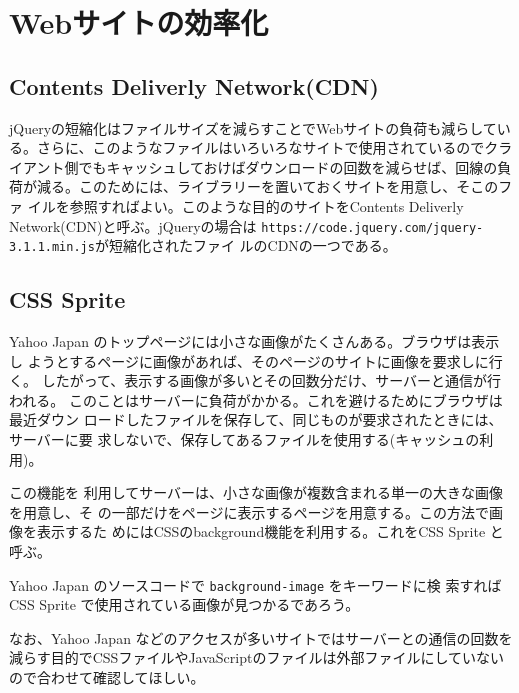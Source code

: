 \section{Webサイトの効率化}
\subsection{Contents Deliverly Network(CDN)}
jQueryの短縮化はファイルサイズを減らすことでWebサイトの負荷も減らしてい
る。さらに、このようなファイルはいろいろなサイトで使用されているのでクラ
イアント側でもキャッシュしておけばダウンロードの回数を減らせば、回線の負
荷が減る。このためには、ライブラリーを置いておくサイトを用意し、そこのファ
イルを参照すればよい。このような目的のサイトをContents Deliverly
Network(CDN)と呼ぶ。jQueryの場合は
\texttt{https://code.jquery.com/jquery-3.1.1.min.js}が短縮化されたファイ
ルのCDNの一つである。
\subsection{CSS Sprite}
Yahoo Japan のトップページには小さな画像がたくさんある。ブラウザは表示し
ようとするページに画像があれば、そのページのサイトに画像を要求しに行く。
したがって、表示する画像が多いとその回数分だけ、サーバーと通信が行われる。
このことはサーバーに負荷がかかる。これを避けるためにブラウザは最近ダウン
ロードしたファイルを保存して、同じものが要求されたときには、サーバーに要
求しないで、保存してあるファイルを使用する(キャッシュの利用)。

この機能を
利用してサーバーは、小さな画像が複数含まれる単一の大きな画像を用意し、そ
の一部だけをページに表示するページを用意する。この方法で画像を表示するた
めにはCSSのbackground機能を利用する。これをCSS Sprite と呼ぶ。

Yahoo Japan のソースコードで \texttt{background-image} をキーワードに検
索すればCSS Sprite で使用されている画像が見つかるであろう。

なお、Yahoo Japan などのアクセスが多いサイトではサーバーとの通信の回数を
減らす目的でCSSファイルやJavaScriptのファイルは外部ファイルにしていない
ので合わせて確認してほしい。